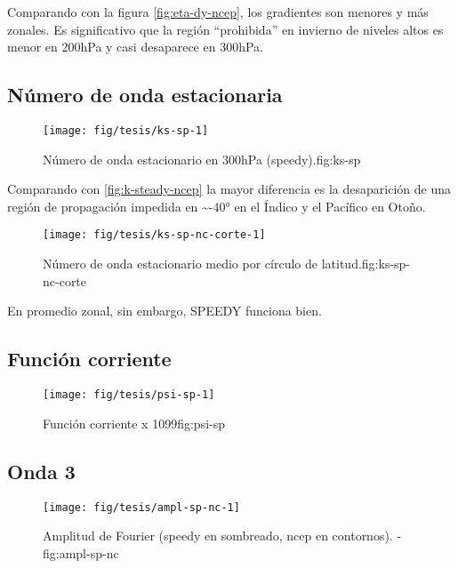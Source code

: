 \documentclass[spanish,a4paper]{book}
\begin{document}
Comparando con la figura \autoref{fig:eta-dy-ncep}, los gradientes son
menores y más zonales. Es significativo que la región ``prohibida'' en
invierno de niveles altos es menor en 200hPa y casi desaparece en
300hPa.

\subsection{Número de onda
estacionaria}\label{numero-de-onda-estacionaria-1}

\begin{figure}
\texttt{[image: fig/tesis/ks-sp-1]} \caption{Número de onda estacionario en 300hPa (speedy).{fig:ks-sp}}\label{fig:ks-sp}
\end{figure}

Comparando con \autoref{fig:k-steady-ncep} la mayor diferencia es la
desaparición de una región de propagación impedida en
\textasciitilde{}-40° en el Índico y el Pacífico en Otoño.

\begin{figure}

{\centering \texttt{[image: fig/tesis/ks-sp-nc-corte-1]} 

}

\caption{Número de onda estacionario medio por círculo de latitud.{fig:ks-sp-nc-corte}}\label{fig:ks-sp-nc-corte}
\end{figure}

En promedio zonal, sin embargo, SPEEDY funciona bien.

\subsection{Función corriente}\label{funcion-corriente-2}

\begin{figure}

{\centering \texttt{[image: fig/tesis/psi-sp-1]} 

}

\caption{Función corriente x 1099{fig:psi-sp}}\label{fig:psi-sp}
\end{figure}

\subsection{Onda 3}\label{onda-3-1}

\begin{figure*}
\texttt{[image: fig/tesis/ampl-sp-nc-1]} \caption{Amplitud de Fourier (speedy en sombreado, ncep en contornos). - fig:ampl-sp-nc}\label{fig:ampl-sp-nc}
\end{figure*}
\end{document}
